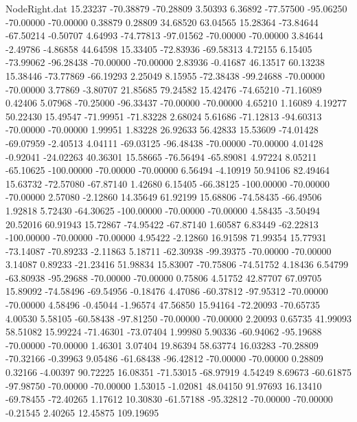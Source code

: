 \begin{filecontents}{NodeRight.dat}
  15.23237  -70.38879  -70.28809     3.50393    6.36892  -77.57500  -95.06250  -70.00000  -70.00000    0.38879    0.28809   34.68520   63.04565
  15.28364  -73.84644  -67.50214    -0.50707    4.64993  -74.77813  -97.01562  -70.00000  -70.00000    3.84644   -2.49786   -4.86858   44.64598
  15.33405  -72.83936  -69.58313     4.72155    6.15405  -73.99062  -96.28438  -70.00000  -70.00000    2.83936   -0.41687   46.13517   60.13238
  15.38446  -73.77869  -66.19293     2.25049    8.15955  -72.38438  -99.24688  -70.00000  -70.00000    3.77869   -3.80707   21.85685   79.24582
  15.42476  -74.65210  -71.16089     0.42406    5.07968  -70.25000  -96.33437  -70.00000  -70.00000    4.65210    1.16089    4.19277   50.22430
  15.49547  -71.99951  -71.83228     2.68024    5.61686  -71.12813  -94.60313  -70.00000  -70.00000    1.99951    1.83228   26.92633   56.42833
  15.53609  -74.01428  -69.07959    -2.40513    4.04111  -69.03125  -96.48438  -70.00000  -70.00000    4.01428   -0.92041  -24.02263   40.36301
  15.58665  -76.56494  -65.89081     4.97224    8.05211  -65.10625 -100.00000  -70.00000  -70.00000    6.56494   -4.10919   50.94106   82.49464
  15.63732  -72.57080  -67.87140     1.42680    6.15405  -66.38125 -100.00000  -70.00000  -70.00000    2.57080   -2.12860   14.35649   61.92199
  15.68806  -74.58435  -66.49506     1.92818    5.72430  -64.30625 -100.00000  -70.00000  -70.00000    4.58435   -3.50494   20.52016   60.91943
  15.72867  -74.95422  -67.87140     1.60587    6.83449  -62.22813 -100.00000  -70.00000  -70.00000    4.95422   -2.12860   16.91598   71.99354
  15.77931  -73.14087  -70.89233    -2.11863    5.18711  -62.30938  -99.39375  -70.00000  -70.00000    3.14087    0.89233  -21.23416   51.98834
  15.83007  -70.75806  -74.51752     4.18436    6.54799  -63.80938  -95.29688  -70.00000  -70.00000    0.75806    4.51752   42.87707   67.09705
  15.89092  -74.58496  -69.54956    -0.18476    4.47086  -60.37812  -97.95312  -70.00000  -70.00000    4.58496   -0.45044   -1.96574   47.56850
  15.94164  -72.20093  -70.65735     4.00530    5.58105  -60.58438  -97.81250  -70.00000  -70.00000    2.20093    0.65735   41.99093   58.51082
  15.99224  -71.46301  -73.07404     1.99980    5.90336  -60.94062  -95.19688  -70.00000  -70.00000    1.46301    3.07404   19.86394   58.63774
  16.03283  -70.28809  -70.32166    -0.39963    9.05486  -61.68438  -96.42812  -70.00000  -70.00000    0.28809    0.32166   -4.00397   90.72225
  16.08351  -71.53015  -68.97919     4.54249    8.69673  -60.61875  -97.98750  -70.00000  -70.00000    1.53015   -1.02081   48.04150   91.97693
  16.13410  -69.78455  -72.40265     1.17612   10.30830  -61.57188  -95.32812  -70.00000  -70.00000   -0.21545    2.40265   12.45875  109.19695

\end{filecontents}
